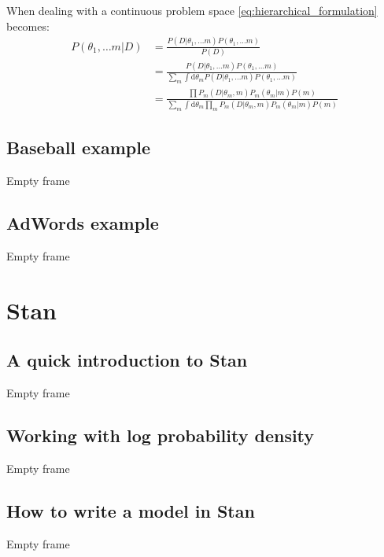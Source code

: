 \documentclass[11pt]{beamer}
\begin{document}
\begin{frame}
	When dealing with a continuous problem space \eqref{eq:hierarchical_formulation} becomes:
	\begin{align}
		P(\theta_1, \dots m | D) &= \frac{P(D | \theta_1, \dots m) P(\theta_1, \dots m)}{P(D)} \\
		&= \frac{P(D | \theta_1, \dots m) P(\theta_1, \dots m)}{\sum\limits_{m} \int \mathrm{d}\theta_{m} P(D | \theta_1, \dots m) P(\theta_1, \dots m)} \\
		&= \frac{\prod P_{m}(D | \theta_{m}, m) P_{m}(\theta_{m} | m) P(m)}{\sum\limits_{m} \int \mathrm{d}\theta_{m} \prod_{m} P_{m}(D | \theta_{m}, m) P_{m}(\theta_{m} | m) P(m)}
	\end{align}		
\end{frame}


\subsection{Baseball example}
\begin{frame}
	Empty frame
\end{frame}

\subsection{AdWords example}
\begin{frame}
	Empty frame
\end{frame}




\section{Stan}

\subsection{A quick introduction to Stan}
\begin{frame}
	Empty frame
\end{frame}

\subsection{Working with log probability density}
\begin{frame}
	Empty frame
\end{frame}

\subsection{How to write a model in Stan}
\begin{frame}
	Empty frame
\end{frame}
\end{document}
